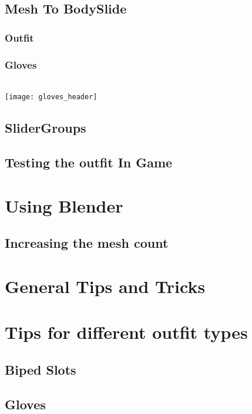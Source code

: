 \documentclass[12pt]{article}
\begin{document}
\subsection{Mesh To BodySlide}
\subsubsection{Outfit}

\pagebreak
\subsubsection{Gloves}
\\
\texttt{[image: gloves\_header]}
\pagebreak
\subsection{SliderGroups}

\pagebreak
\subsection{Testing the outfit In Game}

\pagebreak
\section{Using Blender}
\subsection{Increasing the mesh count}

\pagebreak
\section{General Tips and Tricks}

\pagebreak
\section{Tips for different outfit types}
%
\subsection{Biped Slots}

\pagebreak
\subsection{Gloves}

\pagebreak
\end{document}
